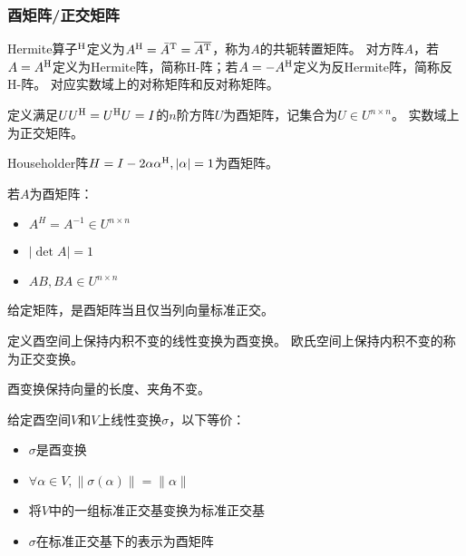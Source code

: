 \subsubsection{酉矩阵/正交矩阵}

\begin{definition}
    Hermite算子${}^\mathrm{H}$定义为$A^\mathrm{H}=\bar{A}^\mathrm{T}=\overline{A^\mathrm{T}}$，称为$A$的共轭转置矩阵。
    对方阵$A$，若$A=A^\mathrm{H}$定义为Hermite阵，简称H-阵；若$A=-A^\mathrm{H}$定义为反Hermite阵，简称反H-阵。
    对应实数域上的对称矩阵和反对称矩阵。
\end{definition}

\begin{definition}
    定义满足$U U^\mathrm{H}=U^\mathrm{H} U=I$的$n$阶方阵$U$为酉矩阵，记集合为$U\in U^{n\times n}$。
    实数域上为正交矩阵。
\end{definition}

\begin{theorem}
    Householder阵$H=I-2\alpha\alpha^\mathrm{H},|\alpha|=1$为酉矩阵。
\end{theorem}

\begin{property}
    若$A$为酉矩阵：
    \begin{itemize}
        \item $A^H=A^{-1}\in U^{n\times n}$
        \item $|\det A|=1$
        \item $AB,BA\in U^{n\times n}$
    \end{itemize}
\end{property}

\begin{theorem}
    给定矩阵，是酉矩阵当且仅当列向量标准正交。
\end{theorem}

\begin{definition}
    定义酉空间上保持内积不变的线性变换为酉变换。
    欧氏空间上保持内积不变的称为正交变换。
\end{definition}

\begin{property}
    酉变换保持向量的长度、夹角不变。
\end{property}

\begin{theorem}
    给定酉空间$V$和$V$上线性变换$\sigma$，以下等价：
    \begin{itemize}
        \item $\sigma$是酉变换
        \item $\forall \alpha\in V, \|\sigma(\alpha)\|=\|\alpha\|$
        \item 将$V$中的一组标准正交基变换为标准正交基
        \item $\sigma$在标准正交基下的表示为酉矩阵
    \end{itemize}
\end{theorem}

